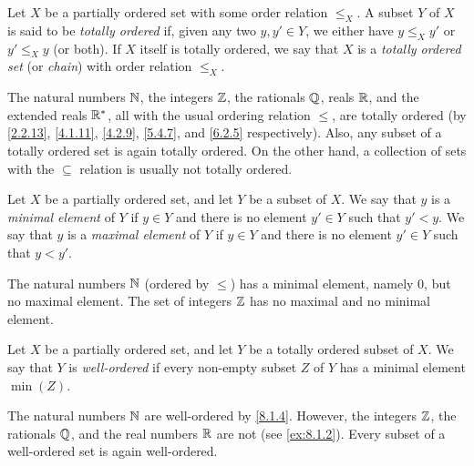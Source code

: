 \begin{defn}\label{8.5.3}
  Let \(X\) be a partially ordered set with some order relation \(\leq_X\).
  A subset \(Y\) of \(X\) is said to be \emph{totally ordered} if, given any two \(y, y' \in Y\), we either have \(y \leq_X y'\) or \(y' \leq_X y\) (or both).
  If \(X\) itself is totally ordered, we say that \(X\) is a \emph{totally ordered set} (or \emph{chain}) with order relation \(\leq_X\).
\end{defn}

\begin{eg}\label{8.5.4}
  The natural numbers \(\mathbb{N}\), the integers \(\mathbb{Z}\), the rationals \(\mathbb{Q}\), reals \(\mathbb{R}\), and the extended reals \(\mathbb{R}^*\), all with the usual ordering relation \(\leq\), are totally ordered
  (by \cref{2.2.13}, \cref{4.1.11}, \cref{4.2.9}, \cref{5.4.7}, and \cref{6.2.5} respectively).
  Also, any subset of a totally ordered set is again totally ordered. On the other hand, a collection of sets with the \(\subseteq\) relation is usually not totally ordered.
\end{eg}

\begin{defn}\label{8.5.5}
  Let \(X\) be a partially ordered set, and let \(Y\) be a subset of \(X\).
  We say that \(y\) is a \emph{minimal element} of \(Y\) if \(y \in Y\) and there is no element \(y' \in Y\) such that \(y' < y\).
  We say that \(y\) is a \emph{maximal element} of \(Y\) if \(y \in Y\) and there is no element \(y' \in Y\) such that \(y < y'\).
\end{defn}

\setcounter{thm}{6}
\begin{eg}\label{8.5.7}
  The natural numbers \(\mathbb{N}\) (ordered by \(\leq\)) has a minimal element, namely \(0\), but no maximal element.
  The set of integers \(\mathbb{Z}\) has no maximal and no minimal element.
\end{eg}

\begin{defn}\label{8.5.8}
  Let \(X\) be a partially ordered set, and let \(Y\) be a totally ordered subset of \(X\).
  We say that \(Y\) is \emph{well-ordered} if every non-empty subset \(Z\) of \(Y\) has a minimal element \(\min(Z)\).
\end{defn}

\begin{eg}\label{8.5.9}
  The natural numbers \(\mathbb{N}\) are well-ordered by \cref{8.1.4}.
  However, the integers \(\mathbb{Z}\), the rationals \(\mathbb{Q}\), and the real numbers \(\mathbb{R}\) are not (see \cref{ex:8.1.2}).
  Every subset of a well-ordered set is again well-ordered.
\end{eg}

